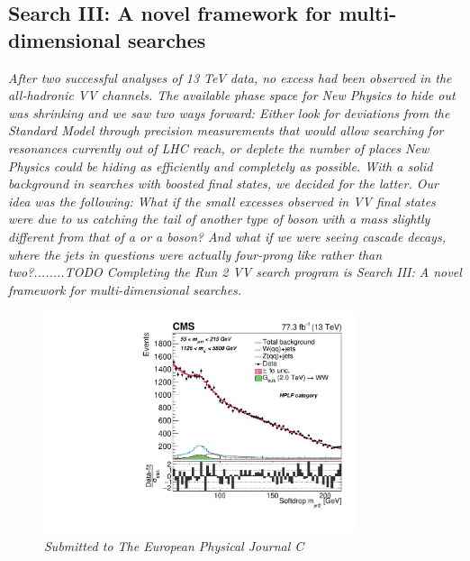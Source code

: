 \vspace*{\fill}
\begin{centering}
\section{Search III: A novel framework for multi-dimensional searches}
\label{searchIII}
\textit{
After two successful analyses of 13 TeV data, no excess had been observed in the all-hadronic VV channels. The available phase space for New Physics to hide out was shrinking and we saw two ways forward: Either look for deviations from the Standard Model through precision measurements that would allow searching for resonances currently out of LHC reach, or deplete the number of places New Physics could be hiding as efficiently and completely as possible.
With a solid background in searches with boosted final states, we decided for the latter. Our idea was the following: What if the small excesses observed in VV final states were due to us catching the tail of another type of boson with a mass slightly different from that of a \PW or a \PZ boson? And what if we were seeing cascade decays, where the jets in questions were actually four-prong like rather than two?........TODO
\newline
\newline
Completing the Run 2 VV search program is Search III: A novel framework for multi-dimensional searches.
}
\end{centering}
\begin{figure}[b!]
    \centering
    \includegraphics[height=6.5cm]{figures/analysis/search3/B2G-18-002/PostFitComboHPLP_Y-Proj__x___0_-1_z___0_-1.pdf}
    \vspace*{10mm}
    \caption*{\footnotesize{\textit{Submitted to The European Physical Journal C}}}
\end{figure}


\clearpage




